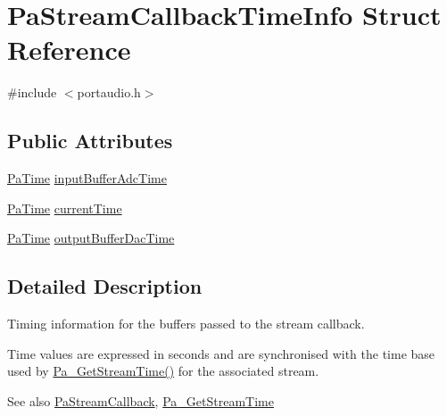 \hypertarget{struct_pa_stream_callback_time_info}{\section{Pa\+Stream\+Callback\+Time\+Info Struct Reference}
\label{struct_pa_stream_callback_time_info}
}


{\ttfamily \#include $<$portaudio.\+h$>$}

\subsection*{Public Attributes}
\begin{DoxyCompactItemize}
\item 
\hyperlink{portaudio_8h_af17a7e6d0471a23071acf8dbd7bbe4bd}{Pa\+Time} \hyperlink{struct_pa_stream_callback_time_info_ad114a6d5e1cf2cdd75837c33c1c8bb4c}{input\+Buffer\+Adc\+Time}
\item 
\hyperlink{portaudio_8h_af17a7e6d0471a23071acf8dbd7bbe4bd}{Pa\+Time} \hyperlink{struct_pa_stream_callback_time_info_af21eb5482cadb212dae38fdbbd9bebfb}{current\+Time}
\item 
\hyperlink{portaudio_8h_af17a7e6d0471a23071acf8dbd7bbe4bd}{Pa\+Time} \hyperlink{struct_pa_stream_callback_time_info_aa2052c42394fca748e83517fc8942609}{output\+Buffer\+Dac\+Time}
\end{DoxyCompactItemize}


\subsection{Detailed Description}
Timing information for the buffers passed to the stream callback.

Time values are expressed in seconds and are synchronised with the time base used by \hyperlink{portaudio_8h_a2b3fb60e6949f37f7f134105ff425749}{Pa\+\_\+\+Get\+Stream\+Time()} for the associated stream.

\begin{DoxySeeAlso}{See also}
\hyperlink{portaudio_8h_a8a60fb2a5ec9cbade3f54a9c978e2710}{Pa\+Stream\+Callback}, \hyperlink{portaudio_8h_a2b3fb60e6949f37f7f134105ff425749}{Pa\+\_\+\+Get\+Stream\+Time} 
\end{DoxySeeAlso}



